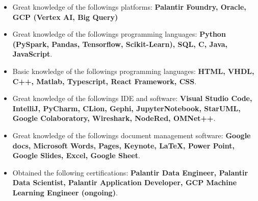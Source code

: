 \documentclass[10pt,a4paper]{altacv}
\begin{document}







\begin{itemize}
  \item Great knowledge of the followings platforms: \textbf{Palantir Foundry, Oracle, GCP (Vertex AI, Big Query)}
  \item Great knowledge of the followings programming languages: \textbf{Python (PySpark, Pandas, Tensorflow, Scikit-Learn), SQL, C, Java, JavaScript}.
  \item Basic knowledge of the followings programming languages: \textbf{HTML, VHDL, C++, Matlab, Typescript, React Framework, CSS}.
  \item Great knowledge of the followings IDE and software: \textbf{Visual Studio Code, IntelliJ, PyCharm, CLion, Gephi, JupyterNotebook, StarUML, Google Colaboratory, Wireshark, NodeRed, OMNet++}.
  \item Great knowledge of the followings document management software: \textbf{Google docs, Microsoft Words, Pages, Keynote, LaTeX, Power Point, Google Slides, Excel, Google Sheet}.
  \item Obtained the following certifications: \textbf{Palantir Data Engineer, Palantir Data Scientist, Palantir Application Developer, GCP Machine Learning Engineer (ongoing)}.
  
\end{itemize}




\end{document}
